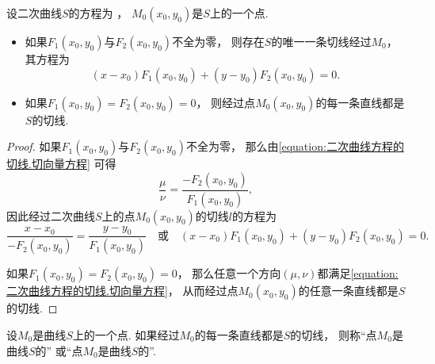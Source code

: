 \begin{theorem}
设二次曲线\(S\)的方程为 ，
\(M_0(x_0,y_0)\)是\(S\)上的一个点.
\begin{itemize}
	\item 如果\(F_1(x_0,y_0)\)与\(F_2(x_0,y_0)\)不全为零，
	则存在\(S\)的唯一一条切线经过\(M_0\)，
	其方程为\begin{equation*}
		(x-x_0) F_1(x_0,y_0) + (y-y_0) F_2(x_0,y_0) = 0.
	\end{equation*}

	\item 如果\(F_1(x_0,y_0) = F_2(x_0,y_0) = 0\)，
	则经过点\(M_0(x_0,y_0)\)的每一条直线都是\(S\)的切线.
\end{itemize}
\begin{proof}
如果\(F_1(x_0,y_0)\)与\(F_2(x_0,y_0)\)不全为零，
那么由\cref{equation:二次曲线方程的切线.切向量方程} 可得\begin{equation*}
	\frac{\mu}{\nu}
	= \frac{-F_2(x_0,y_0)}{F_1(x_0,y_0)},
\end{equation*}
因此经过二次曲线\(S\)上的点\(M_0(x_0,y_0)\)的切线\(l\)的方程为\begin{equation*}
	\frac{x-x_0}{-F_2(x_0,y_0)}
	= \frac{y-y_0}{F_1(x_0,y_0)}
	\quad\text{或}\quad
	(x-x_0) F_1(x_0,y_0) + (y-y_0) F_2(x_0,y_0) = 0.
\end{equation*}

如果\(F_1(x_0,y_0) = F_2(x_0,y_0) = 0\)，
那么任意一个方向\((\mu,\nu)\)都满足\cref{equation:二次曲线方程的切线.切向量方程}，
从而经过点\(M_0(x_0,y_0)\)的任意一条直线都是\(S\)的切线.
\end{proof}
\end{theorem}

\begin{definition}
设\(M_0\)是曲线\(S\)上的一个点.
如果经过\(M_0\)的每一条直线都是\(S\)的切线，
则称“点\(M_0\)是曲线\(S\)的”
或“点\(M_0\)是曲线\(S\)的”.
\end{definition}

